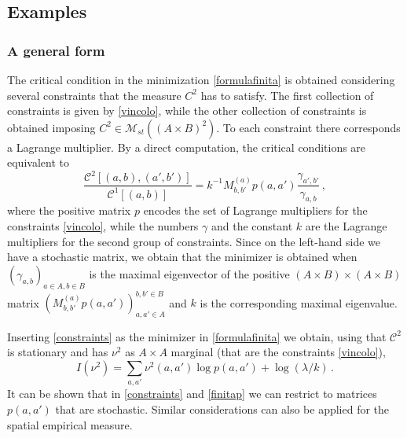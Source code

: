 \documentclass[reqno]{amsart}
\theoremstyle{plain}
\theoremstyle{definition}
\theoremstyle{remark}
\numberwithin{equation}{section}
\numberwithin{theorem}{section}
\newcommand{\<}{\langle}
\renewcommand{\>}{\rangle}
\begin{document}
	\subsection{Examples}
	
	\subsubsection{A general form}
	The critical condition in the minimization \eqref{formulafinita} is obtained considering several constraints that the measure $C^{2}$ has to satisfy. The first collection of constraints is given by \eqref{vincolo}, while the other collection of constraints is obtained imposing $C^{2}\in \mathcal M_{st}\left((A\times B)^2\right)$. To each constraint there corresponds a Lagrange multiplier. By a direct computation, the critical conditions are equivalent to
	\begin{equation}\label{constraints}
		\frac{\mathcal C^{2}\left[(a,b),(a',b')\right]}{\mathcal C^{1}\left[(a,b)\right]}=k^{-1}M^{(a)}_{b,b'}p(a,a')\frac{\gamma_{a',b'}}{\gamma_{a,b}}\,,
	\end{equation}
	where the positive matrix $p$ encodes the set of Lagrange multipliers for the constraints \eqref{vincolo}, while the numbers $\gamma$ and the constant $k$ are the Lagrange multipliers for the second group of constraints. Since on the left-hand side we have a stochastic matrix, we obtain that the minimizer is obtained when $\left(\gamma_{a,b}\right)_{a\in A,b\in B}$ is the maximal eigenvector of the positive $(A\times B)\times (A\times B)$ matrix $\left(M^{(a)}_{b,b'}p(a,a')\right)_{a,a'\in A}^{b,b'\in B}$ and $k$ is the corresponding maximal eigenvalue.
	
	\smallskip
	Inserting \eqref{constraints} as the minimizer in \eqref{formulafinita} we obtain, using that $\mathcal C^{2}$ is stationary and has $\nu^{2}$ as $A\times A$ marginal (that are the constraints \eqref{vincolo}),
	\begin{equation}\label{finitap}
		I(\nu^{2})=\sum_{a,a'}\nu^{2}(a,a')\log p(a,a')+\log (\lambda/k)\,.
	\end{equation}
	It can be shown that in \eqref{constraints} and \eqref{finitap} we can restrict to matrices $p(a,a')$ that are stochastic. Similar considerations can also be applied for the spatial empirical measure.
	
	
	
\end{document}
